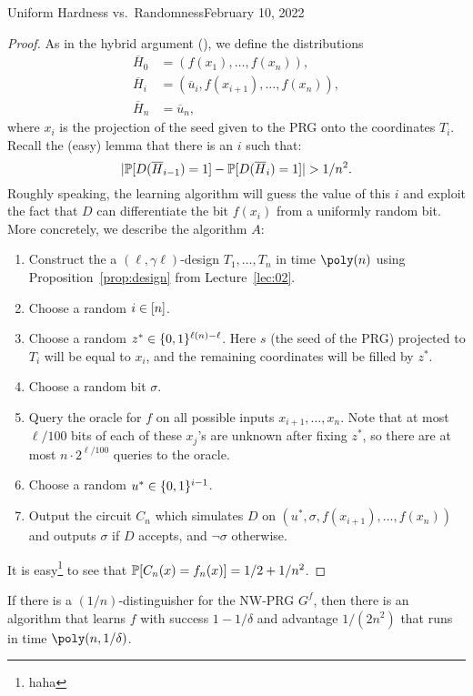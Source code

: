 \begin{lecture}{4}{Uniform Hardness vs.\ Randomness}{February 10, 2022}
\begin{proof}
  As in the hybrid argument (), we define the
  distributions
  \begin{align*}
    \overline{H}_0 &= (f(x_1), \ldots, f(x_n)),\\
    \overline{H}_i &= (\overline{u}_i, f(x_{i + 1}), \ldots, f(x_n)),\\
    \overline{H}_n &= \overline{u}_n,
  \end{align*}
  where $x_i$ is the projection of the seed given to the PRG onto the
  coordinates $T_i$. Recall the (easy) lemma that there is an $i$ such that:
	\[
		\lvert\mathbb{P}[D(\overline{H}_{i - 1}) = 1] - \mathbb{P}[D(\overline{H}_i) = 1]\rvert > 1 / n^2.
	\]
  Roughly speaking, the learning algorithm will guess the value of this $i$ and
  exploit the fact that $D$ can differentiate the bit $f(x_i)$ from a uniformly
  random bit. More concretely, we describe the algorithm $A$:
	\begin{enumerate}
    \item Construct the a $(\ell, \gamma \ell)$-design $T_1, \dots, T_n$ in
      time $\poly(n)$ using Proposition~\ref{prop:design} from
      Lecture~\ref{lec:02}.
		\item Choose a random $i \in [n]$.
		\item Choose a random $z^* \in \{0, 1\}^{\ell(n) - \ell}$. Here $s$
			(the seed of the PRG) projected to $T_i$ will be equal to $x_i$,
			and the remaining coordinates will be filled by $z^*$.
		\item Choose a random bit $\sigma$.
		\item Query the oracle for $f$ on all possible inputs
			$x_{i + 1}, \ldots , x_n$. Note that at most $\ell / 100$ bits of
			each of these $x_j$'s are unknown after fixing $z^*$, so there
			are at most $n \cdot 2^{\ell / 100}$ queries to the oracle.
		\item Choose a random $u^* \in \{0, 1\}^{i - 1}$.
		\item Output the circuit $C_n$ which simulates $D$ on
			$(u^*, \sigma, f(x_{i + 1}), \ldots , f(x_n))$ and outputs
			$\sigma$ if $D$ accepts, and $\lnot \sigma$ otherwise.
	\end{enumerate}
	It is easy\footnote{haha} to see that
	$\mathbb{P}[C_n(x) = f_n(x)] = 1/2 + 1/n^2$.
\end{proof}

\begin{corollary}
  If there is a $(1/n)$-distinguisher for the NW-PRG $G^f$, then there is an
  algorithm that learns $f$ with success $1 - 1/\delta$ and advantage
  $1/(2n^2)$ that runs in time $\poly(n, 1/\delta)$.
\end{corollary}


\end{lecture}
